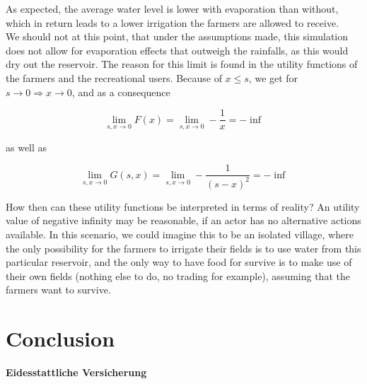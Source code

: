\documentclass[12pt, a4paper, oneside]{article}
\begin{document}
As expected, the average water level is lower with evaporation than without, which in return leads to a lower irrigation the farmers are allowed to receive. \\
We should not at this point, that under the assumptions made, this simulation does not allow for evaporation effects that outweigh the rainfalls, as this would dry out the reservoir. The reason for this limit is found in the utility functions of the farmers and the recreational users. Because of $x\leq s$, we get for $s\to 0 \Rightarrow x\to 0$, and as a consequence 

\begin{equation}
\lim_{s, x\to0}F(x) = \lim_{s,x\to0}-\frac{1}{x} = -\inf
\end{equation}

as well as

\begin{equation}
\lim_{s, x\to0}G(s,x) = \lim_{s,x\to0}-\frac{1}{(s-x)^2} = -\inf
\end{equation}

How then can these utility functions be interpreted in terms of reality? 
An utility value of negative infinity may be reasonable, if an actor has no alternative actions available. 
In this scenario, we could imagine this to be an isolated village, where the only possibility for the farmers to irrigate their fields is to use water from this particular reservoir, and the only way to have food for survive is to make use of their own fields (nothing else to do, no trading for example), assuming that the farmers want to survive. 

\section{Conclusion}
\printbibliography

\newpage






\pagestyle{empty} 
\begingroup
\begin{center}
	\large
	\textbf{Eidesstattliche Versicherung}
\end{center}

\vspace{0.3cm}
\end{document}
